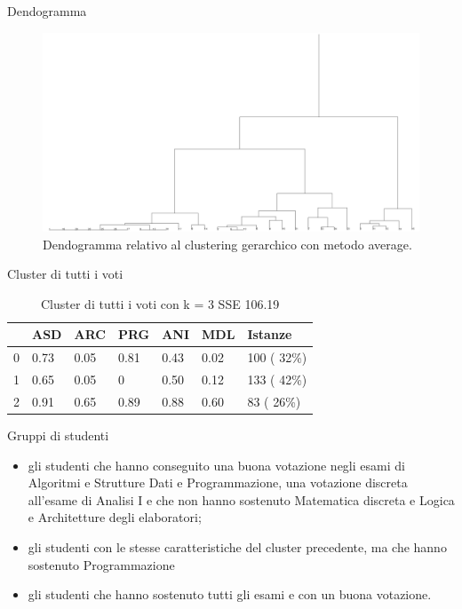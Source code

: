\documentclass{beamer}
\begin{document}
\begin{frame}{Dendogramma}
  \begin{figure}[bt]
    \includegraphics[width=\textwidth]{../img/hierarchical-average.png}
    \caption{Dendogramma relativo al clustering gerarchico con metodo average.}
  \end{figure}
\end{frame}

\begin{frame}{Cluster di tutti i voti}
  \begin{table}[ht]
    \centering
    \begin{tabular}{@{}lllllll@{}}
    \toprule
      & ASD  & ARC  & PRG & ANI  & MDL  & Istanze      \\ \midrule
    0 & 0.73 & 0.05 & 0.81& 0.43 & 0.02 &  100  ( 32\%)\\
    1 & 0.65 & 0.05 & 0   & 0.50 & 0.12 &  133 ( 42\%) \\
    2 & 0.91 & 0.65 & 0.89& 0.88 & 0.60 &  83  ( 26\%) \\ \bottomrule
    \end{tabular}
    \caption{Cluster di tutti i voti con k = 3 SSE 106.19}
    \label{c3V}
  \end{table}
\end{frame}

\begin{frame}{Gruppi di studenti}
  \begin{itemize}
    \item gli studenti che hanno conseguito una buona votazione negli esami di Algoritmi e Strutture Dati e Programmazione,
    una votazione dis\-creta all'esame di Analisi I e che non hanno sostenuto Matematica discreta e Logica e Architetture degli elaboratori;
    \item gli studenti con le stesse caratteristiche del cluster precedente, ma che hanno sostenuto Programmazione
    \item gli studenti che hanno sostenuto tutti gli esami e con un buona vota\-zione.
  \end{itemize}
\end{frame}
\end{document}
